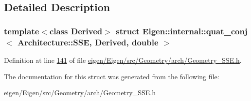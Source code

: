 \subsection{Detailed Description}
\subsubsection*{template$<$class Derived$>$\newline
struct Eigen\+::internal\+::quat\+\_\+conj$<$ Architecture\+::\+S\+S\+E, Derived, double $>$}



Definition at line \hyperlink{eigen_2_eigen_2src_2_geometry_2arch_2_geometry___s_s_e_8h_source_l00141}{141} of file \hyperlink{eigen_2_eigen_2src_2_geometry_2arch_2_geometry___s_s_e_8h_source}{eigen/\+Eigen/src/\+Geometry/arch/\+Geometry\+\_\+\+S\+S\+E.\+h}.



The documentation for this struct was generated from the following file\+:\begin{DoxyCompactItemize}
\item 
eigen/\+Eigen/src/\+Geometry/arch/\+Geometry\+\_\+\+S\+S\+E.\+h\end{DoxyCompactItemize}
